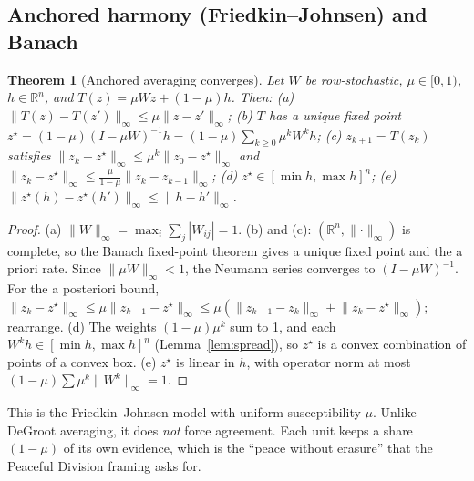 \documentclass[11pt]{article}
\newtheorem{theorem}{Theorem}
\theoremstyle{definition}
\theoremstyle{remark}
\newcommand{\R}{\mathbb{R}}
\newcommand{\ninf}[1]{\lVert #1\rVert_\infty}
\begin{document}
\subsection{Anchored harmony (Friedkin--Johnsen) and Banach}
\begin{theorem}[Anchored averaging converges]\label{thm:fj}
Let $W$ be row-stochastic, $\mu\in[0,1)$, $h\in\R^n$, and $T(z)=\mu Wz+(1-\mu)h$. Then:
(a) $\ninf{T(z)-T(z')}\le\mu\ninf{z-z'}$;
(b) $T$ has a unique fixed point $z^\star=(1-\mu)(I-\mu W)^{-1}h=(1-\mu)\sum_{k\ge0}\mu^kW^kh$;
(c) $z_{k+1}=T(z_k)$ satisfies $\ninf{z_k-z^\star}\le\mu^k\ninf{z_0-z^\star}$ and $\ninf{z_k-z^\star}\le\frac{\mu}{1-\mu}\ninf{z_k-z_{k-1}}$;
(d) $z^\star\in[\min h,\max h]^n$;
(e) $\ninf{z^\star(h)-z^\star(h')}\le\ninf{h-h'}$.
\end{theorem}
\begin{proof}
(a) $\ninf{W}=\max_i\sum_j|W_{ij}|=1$. (b) and (c): $(\R^n,\ninf{\cdot})$ is complete, so the Banach fixed-point theorem \citep{banach1922} gives a unique fixed point and the a priori rate. Since $\ninf{\mu W}<1$, the Neumann series converges to $(I-\mu W)^{-1}$. For the a posteriori bound, $\ninf{z_k-z^\star}\le\mu\ninf{z_{k-1}-z^\star}\le\mu(\ninf{z_{k-1}-z_k}+\ninf{z_k-z^\star})$; rearrange. (d) The weights $(1-\mu)\mu^k$ sum to 1, and each $W^kh\in[\min h,\max h]^n$ (Lemma~\ref{lem:spread}), so $z^\star$ is a convex combination of points of a convex box. (e) $z^\star$ is linear in $h$, with operator norm at most $(1-\mu)\sum\mu^k\ninf{W^k}=1$.
\end{proof}
This is the Friedkin--Johnsen model \citep{friedkin1990} with uniform susceptibility $\mu$. Unlike DeGroot averaging, it does \emph{not} force agreement. Each unit keeps a share $(1-\mu)$ of its own evidence, which is the ``peace without erasure'' that the Peaceful Division framing asks for.

\end{document}
